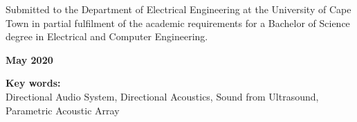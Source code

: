 \begin{titlepage}
\vskip 10mm
\begin{center}
Submitted to the Department of Electrical Engineering at the University of Cape Town in partial
fulfilment of the academic requirements for a Bachelor of Science degree in Electrical and Computer Engineering.
\end{center}


\vskip 5mm
\begin{center}{\bf May 2020}
\end{center}

\begin{center}
\textbf{Key words:}\\
Directional Audio System, Directional Acoustics, Sound from Ultrasound, Parametric Acoustic Array
\end{center}

\end{titlepage}